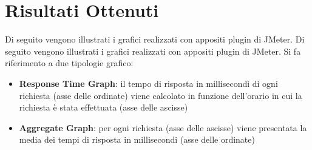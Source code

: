 
\section{Risultati Ottenuti}
Di seguito vengono illustrati i grafici realizzati con appositi plugin di JMeter. 
Di seguito vengono illustrati i grafici realizzati con appositi plugin di JMeter. Si fa riferimento a due tipologie grafico:
\begin{itemize}
    \item \textbf{Response Time Graph}: il tempo di risposta in millisecondi di ogni richiesta (asse delle ordinate) viene calcolato in funzione dell'orario in cui la richiesta è stata effettuata (asse delle ascisse) 
    \item \textbf{Aggregate Graph}: per ogni richiesta (asse delle ascisse) viene presentata la media dei tempi di risposta in millisecondi (asse delle ordinate)
\end{itemize}

